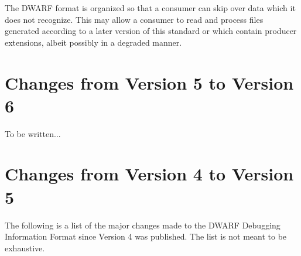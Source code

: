 The DWARF format is organized so that a consumer can skip over
data which it does not recognize. This may allow a consumer
to read and process files generated according to a later
version of this standard or which contain
\bb
producer
\eb
extensions, albeit possibly in a degraded manner.

\bb
\section{Changes from Version 5 to Version 6}
To be written...
\eb

\section{Changes from Version 4 to Version 5}
The following is a list of the major changes made to the
DWARF Debugging Information Format since Version 4 was published.
The list is not meant to be exhaustive.
